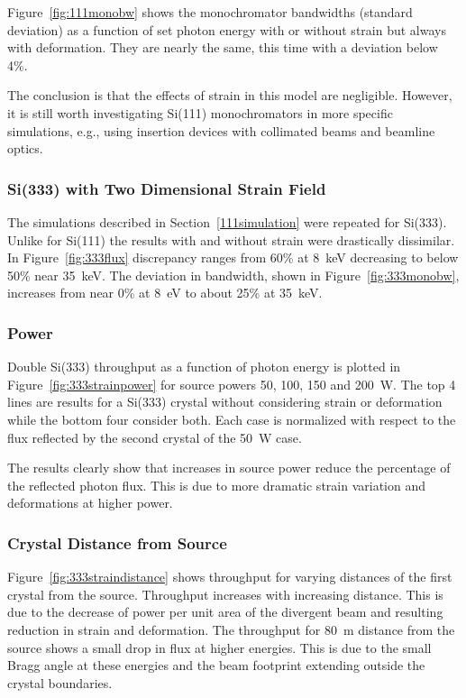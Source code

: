 \documentclass{iucr}
\begin{document}
Figure~\ref{fig:111monobw} shows the monochromator bandwidths (standard deviation) as a function of set photon energy with or without strain but always with deformation. They are nearly the same, this time with a deviation below 4\%.

The conclusion is that the effects of strain in this model are negligible. However, it is still worth investigating Si(111) monochromators in more specific simulations, e.g., using insertion devices with collimated beams and beamline optics.

\subsubsection{Si(333) with Two Dimensional Strain Field}\label{parameterscans}

The simulations described in Section~\ref{111simulation} were repeated for Si(333). Unlike for Si(111) the results with and without strain were drastically dissimilar. In Figure~\ref{fig:333flux} discrepancy ranges from 60\% at 8~keV decreasing to below 50\% near 35~keV. The deviation in bandwidth, shown in Figure~\ref{fig:333monobw}, increases from near 0\% at 8~eV to about 25\% at 35~keV.

\subsubsection{Power}
Double Si(333) throughput as a function of photon energy is plotted in Figure~\ref{fig:333strainpower} for source powers 50, 100, 150 and 200~W. The top 4 lines are results for a Si(333) crystal without considering strain or deformation while the bottom four consider both. Each case is normalized with respect to the flux reflected by the second crystal of the 50~W case.

The results clearly show that increases in source power reduce the percentage of the reflected photon flux. This is due to more dramatic strain variation and deformations at higher power.

\subsubsection{Crystal Distance from Source}
Figure~\ref{fig:333straindistance} shows throughput for varying distances of the first crystal from the source. Throughput increases with increasing distance. This is due to the decrease of power per unit area of the divergent beam and resulting reduction in strain and deformation. The throughput for 80~m distance from the source shows a small drop in flux at higher energies. This is due to the small Bragg angle at these energies and the beam footprint extending outside the crystal boundaries.
\end{document}
